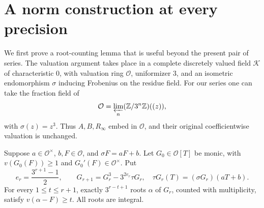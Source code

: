 \section{A norm construction at every precision}
\label{sec:norm}

We first prove a root-counting lemma that is useful beyond the present
pair of series. The valuation argument takes place in a complete
discretely valued field $\mathcal K$ of characteristic $0$, with
valuation ring $\mathcal O$, uniformizer $3$, and an isometric
endomorphism $\sigma$ inducing Frobenius on the residue field.
For our series one can take the fraction field of
\[
 \mathcal O=\varprojlim_n(\mathbb Z/3^n\mathbb Z)((z)),
\]
with $\sigma(z)=z^3$. Thus $A,B,R_\infty$ embed in $\mathcal O$,
and their original coefficientwise valuation is unchanged.

\begin{lemma}\label{lem:packets}
Suppose $a\in\mathcal O^\times$, $b,F\in\mathcal O$, and
$\sigma F=aF+b$. Let $G_0\in\mathcal O[T]$ be monic, with
$v(G_0(F))\ge1$ and $G_0'(F)\in\mathcal O^\times$. Put
\[
 e_r=\frac{3^{r+1}-1}{2},\qquad
 G_{r+1}=G_r^3-3^{2e_r}\tau G_r,
 \quad\tau G_r(T)=(\sigma G_r)(aT+b).
\]
For every $1\le t\le r+1$, exactly $3^{r-t+1}$ roots $\alpha$
of $G_r$, counted with multiplicity, satisfy $v(\alpha-F)\ge t$.
All roots are integral.
\end{lemma}
